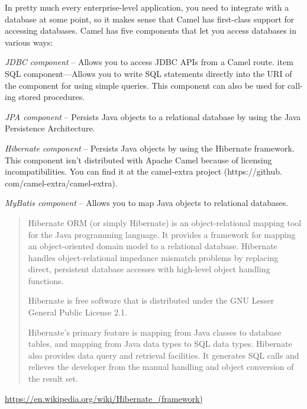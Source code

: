 \documentclass[Screen16to9,17pt]{foils}
\begin{document}
In pretty much every enterprise-­level application, you need to integrate with a database at some point, so it makes sense that Camel has first-­class support for accessing databases. Camel has five components that let you access databases in various ways:
\begin{list2}
\item \emph{JDBC component} -- Allows you to access JDBC APIs from a Camel route.
item SQL component—Allows you to write SQL statements directly into the URI of the
component for using simple queries. This component can also be used for call-
ing stored procedures.
\item \emph{JPA component} -- Persists Java objects to a relational database by using the Java Persistence Architecture.
\item \emph{Hibernate component} -- Persists Java objects by using the Hibernate framework.
This component isn’t distributed with Apache Camel because of licensing
incompatibilities. You can find it at the camel-­extra project (https://github.
com/camel-­extra/camel-­extra).
\item \emph{MyBatis component} -- Allows you to map Java objects to relational databases.
\end{list2}



\begin{quote}
  Hibernate ORM (or simply Hibernate) is an object-relational mapping tool for the Java programming language. It provides a framework for mapping an object-oriented domain model to a relational database. Hibernate handles object-relational impedance mismatch problems by replacing direct, persistent database accesses with high-level object handling functions.

  Hibernate is free software that is distributed under the GNU Lesser General Public License 2.1.

  Hibernate's primary feature is mapping from Java classes to database tables, and mapping from Java data types to SQL data types. Hibernate also provides data query and retrieval facilities. It generates SQL calls and relieves the developer from the manual handling and object conversion of the result set.
\end{quote}

\url{https://en.wikipedia.org/wiki/Hibernate_(framework)}

\end{document}
